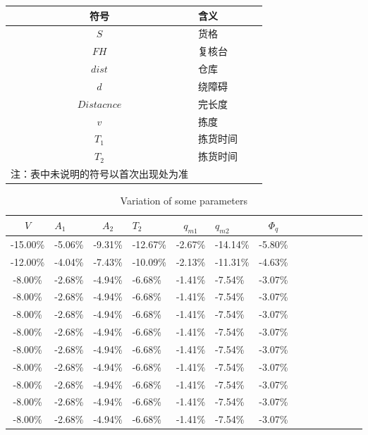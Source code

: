 \documentclass[bwprint]{gmcmthesis}
\begin{document}
\begin{center}
	\begin{tabular}{cp{6cm}<{\centering}cp{3cm}<{\centering}}
			\toprule[1.5pt]
			符号 & 含义\\
			\midrule[1pt]
			$S$ &货格\\
			$FH$ &复核台\\
			$dist$ &仓库\\
			$d$ & 绕障碍\\
			$Distacnce$ &完长度\\
			$v$ &拣度\\
			$T_{1}$ &拣货时间\\
			$T_{2}$ &拣货时间\\
			\bottomrule[1.5pt]
			注：表中未说明的符号以首次出现处为准
		\end{tabular}
\end{center}

\begin{table}[h] 
	\centering 
	\caption{Variation of some parameters}  
	\label{tab7} 
	\begin{tabular}{cp{3cm}<{\centering}cp{3cm}<{\centering}cp{3cm}<{\centering}cp{3cm}<{\centering}cp{3cm}<{\centering}cp{1cm}<{\centering}cp{1cm}<{\centering}} %
			\toprule[1.5pt]  
			$V$      & $A_1$   & $A_2$   & $T_2$    & $q_{m1}$ & $q_{m2}$ & $\Phi_q$ \\
			\midrule[0.5pt]
			-15.00\% & -5.06\% & -9.31\% & -12.67\% & -2.67\%  & -14.14\% & -5.80\% \\
			-12.00\% & -4.04\% & -7.43\% & -10.09\% & -2.13\%  & -11.31\% & -4.63\% \\
			-8.00\%  & -2.68\% & -4.94\% & -6.68\%  & -1.41\%  & -7.54\%  & -3.07\% \\
			-8.00\%  & -2.68\% & -4.94\% & -6.68\%  & -1.41\%  & -7.54\%  & -3.07\% \\
			-8.00\%  & -2.68\% & -4.94\% & -6.68\%  & -1.41\%  & -7.54\%  & -3.07\% \\
			-8.00\%  & -2.68\% & -4.94\% & -6.68\%  & -1.41\%  & -7.54\%  & -3.07\% \\
			-8.00\%  & -2.68\% & -4.94\% & -6.68\%  & -1.41\%  & -7.54\%  & -3.07\% \\
			-8.00\%  & -2.68\% & -4.94\% & -6.68\%  & -1.41\%  & -7.54\%  & -3.07\% \\
			-8.00\%  & -2.68\% & -4.94\% & -6.68\%  & -1.41\%  & -7.54\%  & -3.07\% \\
			-8.00\%  & -2.68\% & -4.94\% & -6.68\%  & -1.41\%  & -7.54\%  & -3.07\% \\
			-8.00\%  & -2.68\% & -4.94\% & -6.68\%  & -1.41\%  & -7.54\%  & -3.07\% \\
			\bottomrule[1.5pt]  
		\end{tabular}
\end{table}
\end{document}
